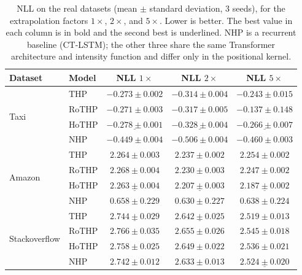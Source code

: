 \begin{table}[h!]
\centering
\caption{NLL on the real datasets (mean $\pm$ standard deviation, 3 seeds), for the extrapolation factors $1\times$, $2\times$, and $5\times$. Lower is better. The best value in each column is in bold and the second best is underlined. NHP is a recurrent baseline (CT-LSTM); the other three share the same Transformer architecture and intensity function and differ only in the positional kernel.}
\label{tab:resultados-reais}
\begin{tabular}{llccc}
\toprule
Dataset & Model & NLL $1\times$ & NLL $2\times$ & NLL $5\times$ \\
\midrule
\multirow{4}{*}{Taxi}
    & THP    & $-0.273 \pm 0.002$ & $-0.314 \pm 0.004$ & $-0.243 \pm 0.015$ \\
    & RoTHP  & $-0.271 \pm 0.003$ & $-0.317 \pm 0.005$ & $-0.137 \pm 0.148$ \\
    & HoTHP  & $\underline{-0.278 \pm 0.001}$ & $\underline{-0.328 \pm 0.004}$ & $\underline{-0.266 \pm 0.007}$ \\
    & NHP    & $\mathbf{-0.449 \pm 0.004}$ & $\mathbf{-0.506 \pm 0.004}$ & $\mathbf{-0.460 \pm 0.003}$ \\
\midrule
\multirow{4}{*}{Amazon}
    & THP    & $2.264 \pm 0.003$ & $2.237 \pm 0.002$ & $2.254 \pm 0.002$ \\
    & RoTHP  & $2.268 \pm 0.004$ & $2.230 \pm 0.003$ & $2.247 \pm 0.002$ \\
    & HoTHP  & $\underline{2.263 \pm 0.004}$ & $\underline{2.207 \pm 0.003}$ & $\underline{2.187 \pm 0.002}$ \\
    & NHP    & $\mathbf{0.658 \pm 0.229}$ & $\mathbf{0.630 \pm 0.227}$ & $\mathbf{0.638 \pm 0.224}$ \\
\midrule
\multirow{4}{*}{Stackoverflow}
    & THP    & $\underline{2.744 \pm 0.029}$ & $\underline{2.642 \pm 0.025}$ & $\mathbf{2.519 \pm 0.013}$ \\
    & RoTHP  & $2.766 \pm 0.035$ & $2.655 \pm 0.026$ & $2.545 \pm 0.018$ \\
    & HoTHP  & $2.758 \pm 0.025$ & $2.649 \pm 0.022$ & $2.536 \pm 0.021$ \\
    & NHP    & $\mathbf{2.742 \pm 0.012}$ & $\mathbf{2.633 \pm 0.013}$ & $\underline{2.524 \pm 0.020}$ \\
\bottomrule
\end{tabular}
\end{table}

